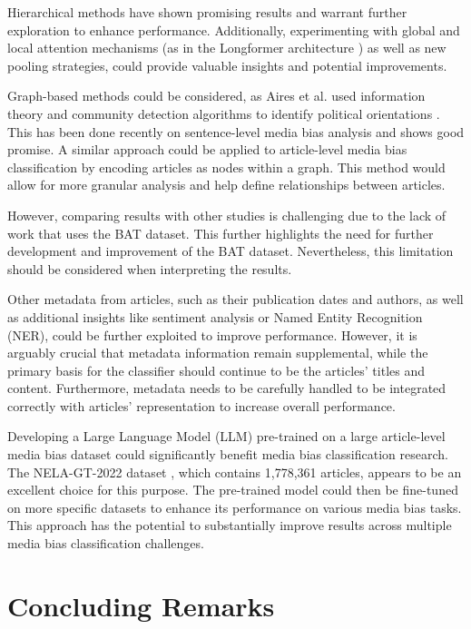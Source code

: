 Hierarchical methods have shown promising results and warrant further exploration to enhance performance. Additionally, experimenting with global and local attention mechanisms (as in the Longformer architecture \cite{beltagy-2020-longformer}) as well as new pooling strategies, could provide valuable insights and potential improvements.

Graph-based methods could be considered, as Aires et al. used information theory and community detection algorithms to identify political orientations \cite{aires-2020-information}. This has been done recently on sentence-level media bias analysis \cite{lei-2024-event-relation} and shows good promise. A similar approach could be applied to article-level media bias classification by encoding articles as nodes within a graph. This method would allow for more granular analysis and help define relationships between articles.

However, comparing results with other studies is challenging due to the lack of work that uses the BAT dataset. This further highlights the need for further development and improvement of the BAT dataset. Nevertheless, this limitation should be considered when interpreting the results.

Other metadata from articles, such as their publication dates and authors, as well as additional insights like sentiment analysis or Named Entity Recognition (NER), could be further exploited to improve performance. However, it is arguably crucial that metadata information remain supplemental, while the primary basis for the classifier should continue to be the articles' titles and content. Furthermore, metadata needs to be carefully handled to be integrated correctly with articles' representation to increase overall performance.

Developing a Large Language Model (LLM) pre-trained on a large article-level media bias dataset could significantly benefit media bias classification research. The NELA-GT-2022 dataset \cite{gruppi-2023-nela-gt-2022}, which contains 1,778,361 articles, appears to be an excellent choice for this purpose. The pre-trained model could then be fine-tuned on more specific datasets to enhance its performance on various media bias tasks. This approach has the potential to substantially improve results across multiple media bias classification challenges.


\section{Concluding Remarks}

